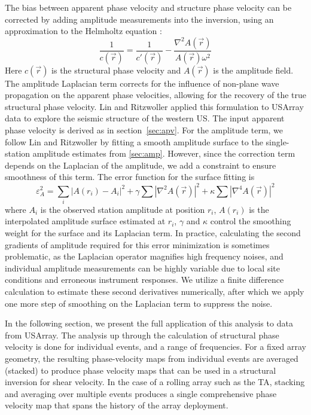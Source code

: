\documentclass{gji}
\begin{document}
The bias between apparent phase velocity and structure phase velocity can be corrected by adding amplitude measurements into the inversion, using an approximation to the Helmholtz equation \cite{Wielandt:1993ws,Lin:2011fw}:
\[
\frac{1}{c(\vec{r})} = \frac{1}{c'(\vec{r})} - 
\frac{ \nabla^2 A(\vec{r})}{A(\vec{r}) \omega^2}
\]
Here $c(\vec{r})$ is the structural phase velocity and $A(\vec{r})$ is the amplitude field. The amplitude Laplacian term corrects for the influence of non-plane wave propagation on the apparent phase velocities, allowing for the recovery of the true structural phase velocity. Lin and Ritzwoller  applied this formulation to USArray data to explore the seismic structure of the western US.
The input apparent phase velocity is derived as in section~\ref{sec:apv}.  For the amplitude term, we follow Lin and Ritzwoller  by fitting a smooth amplitude surface to the single-station amplitude estimates from \ref{sec:amp}. However, since the correction term depends on the Laplacian of the amplitude, we add a constraint to ensure smoothness of this term. The error function for the surface fitting is
\[
\varepsilon_{A}^2 = \sum_i\left|A(r_i)-A_i\right|^2 + \gamma\sum |\nabla^2 A(\vec{r})|^2 + \kappa \sum |\nabla^4 A(\vec{r})|^2
\]
where $A_i$ is the observed station amplitude at position $r_i$, $A(r_i)$ is the interpolated amplitude surface estimated at $r_i$, $\gamma$ and $\kappa$ control the smoothing weight for the surface and its Laplacian term. In practice, calculating the second gradients of amplitude required for this error minimization is sometimes problematic, as the Laplacian operator magnifies high frequency noises, and individual amplitude measurements can be highly variable due to local site conditions and erroneous instrument responses. We utilize a finite difference calculation to estimate these second derivatives numerically, after which we apply one more step of smoothing on the Laplacian term to suppress the noise.

In the following section, we present the full application of this analysis to data from USArray. The analysis up through the calculation of structural phase velocity is done for individual events, and a range of frequencies.  For a fixed array geometry, the resulting phase-velocity maps from individual events are averaged (stacked) to produce phase velocity maps that can be used in a structural inversion for shear velocity.  In the case of a rolling array such as the TA, stacking and averaging over multiple events produces a single comprehensive phase velocity map that spans the history of the array deployment.   
\end{document}
